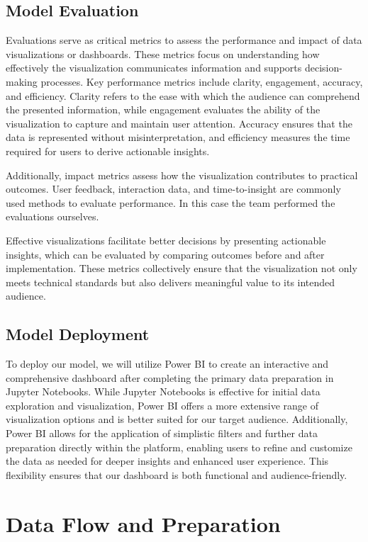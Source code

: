 \subsection*{Model Evaluation}
Evaluations serve as critical metrics to assess the performance and impact of data visualizations or dashboards. These metrics focus on understanding how effectively the visualization communicates information and supports decision-making processes. Key performance metrics include clarity, engagement, accuracy, and efficiency. Clarity refers to the ease with which the audience can comprehend the presented information, while engagement evaluates the ability of the visualization to capture and maintain user attention. Accuracy ensures that the data is represented without misinterpretation, and efficiency measures the time required for users to derive actionable insights.

Additionally, impact metrics assess how the visualization contributes to practical outcomes. User feedback, interaction data, and time-to-insight are commonly used methods to evaluate performance. In this case the team performed the evaluations ourselves. 

Effective visualizations facilitate better decisions by presenting actionable insights, which can be evaluated by comparing outcomes before and after implementation. These metrics collectively ensure that the visualization not only meets technical standards but also delivers meaningful value to its intended audience.

\subsection*{Model Deployment}
To deploy our model, we will utilize Power BI to create an interactive and comprehensive dashboard after completing the primary data preparation in Jupyter Notebooks. While Jupyter Notebooks is effective for initial data exploration and visualization, Power BI offers a more extensive range of visualization options and is better suited for our target audience. Additionally, Power BI allows for the application of simplistic filters and further data preparation directly within the platform, enabling users to refine and customize the data as needed for deeper insights and enhanced user experience. This flexibility ensures that our dashboard is both functional and audience-friendly.

\section{Data Flow and Preparation}

